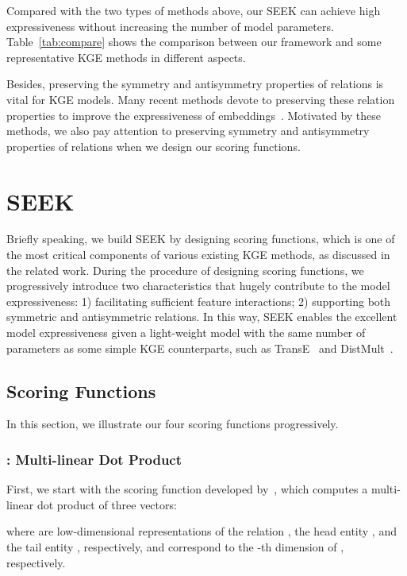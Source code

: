 \documentclass[11pt,a4paper]{article}
\begin{document}
Compared with the two types of methods above, our SEEK can achieve high expressiveness without increasing the number of model parameters. Table~\ref{tab:compare} shows the comparison between our framework and some representative KGE methods in different aspects. 

Besides, preserving the symmetry and antisymmetry properties of relations is vital for KGE models. Many recent methods devote to preserving these relation properties to improve the expressiveness of embeddings~\cite{trouillon2016complex,nickel2016holographic,guo2018:RUGE, boyang2018:aer,kazemi2018simple,sun2018rotate,DBLP:conf/acl/XuL19}.  Motivated by these methods, we also pay attention to preserving symmetry and antisymmetry properties of relations when we design our scoring functions.
 \section{SEEK}
\label{sec:complex}



Briefly speaking, we build SEEK by designing scoring functions, which is one of the most critical components of various existing KGE methods, as discussed in the related work.
During the procedure of designing scoring functions, we progressively introduce two characteristics that hugely contribute to the model expressiveness:
1) facilitating sufficient feature interactions;
2) supporting both symmetric and antisymmetric relations.
In this way, SEEK enables the excellent model expressiveness given a light-weight model with the same number of parameters as some simple KGE counterparts, such as TransE~\cite{bordes2013translating} and DistMult~\cite{yang2015embedding}.

\subsection{Scoring Functions}
In this section, we illustrate our four scoring functions progressively.

\subsubsection{: Multi-linear Dot Product}
First, we start with the scoring function  developed by~\citet{yang2015embedding}, which computes a multi-linear dot product of three vectors:

where  are low-dimensional representations of the relation , the head entity , and the tail entity , respectively, and  correspond to the -th dimension of , respectively.
\end{document}
